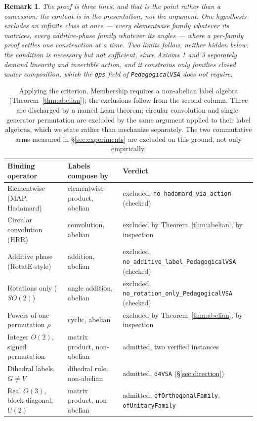 \documentclass[10pt]{article}
\newtheorem{remark}[theorem]{Remark}
\begin{document}
\begin{remark}
\label{rem:criterion}
The proof is three lines, and that is the point rather than a concession: the content is in the \emph{presentation}, not the argument. One hypothesis excludes an infinite class at once --- every elementwise family whatever its matrices, every additive-phase family whatever its angles --- where a per-family proof settles one construction at a time. Two limits follow, neither hidden below: the condition is necessary but not sufficient, since Axioms 1 and 3 separately demand linearity and invertible action, and it constrains only families closed under composition, which the \texttt{ops} field of \texttt{PedagogicalVSA} does not require.
\end{remark}

\begin{table}[t]
\centering
\caption{Applying the criterion. Membership requires a non-abelian label algebra (Theorem~\ref{thm:abelian}); the exclusions follow from the second column. Three are discharged by a named Lean theorem; circular convolution and single-generator permutation are excluded by the same argument applied to their label algebras, which we state rather than mechanize separately. The two commutative arms measured in \S\ref{sec:experiments} are excluded on this ground, not only empirically.}
\label{tab:criterion}
\small
\begin{tabular}{llp{}}
\toprule
Binding operator & Labels compose by & Verdict \\
\midrule
Elementwise (MAP, Hadamard)        & elementwise product, abelian & excluded, \texttt{no\_hadamard\_\allowbreak via\_action} (checked) \\
Circular convolution (HRR)         & convolution, abelian         & excluded by Theorem~\ref{thm:abelian}, by inspection \\
Additive phase (RotatE-style)      & addition, abelian            & excluded, \texttt{no\_additive\_\allowbreak label\_\allowbreak PedagogicalVSA} (checked) \\
Rotations only ($SO(2)$)           & angle addition, abelian      & excluded, \texttt{no\_rotation\_\allowbreak only\_\allowbreak PedagogicalVSA} (checked) \\
Powers of one permutation $\rho$   & cyclic, abelian              & excluded by Theorem~\ref{thm:abelian}, by inspection \\
Integer $O(2)$, signed permutation & matrix product, non-abelian  & admitted, two verified instances \\
Dihedral labels, $G \neq V$        & dihedral rule, non-abelian   & admitted, \texttt{d4VSA} (\S\ref{sec:direction}) \\
Real $O(3)$, block-diagonal, $U(2)$ & matrix product, non-abelian & admitted, \texttt{ofOrthogonalFamily}, \texttt{ofUnitaryFamily} \\
\bottomrule
\end{tabular}
\end{table}
\end{document}
